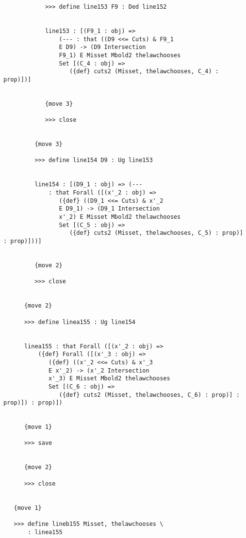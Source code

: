 \documentclass[12pt]{article}
\begin{document}
\begin{verbatim}
            >>> define line153 F9 : Ded line152


            line153 : [(F9_1 : obj) => 
                (--- : that ((D9 <<= Cuts) & F9_1 
                E D9) -> (D9 Intersection 
                F9_1) E Misset Mbold2 thelawchooses 
                Set [(C_4 : obj) => 
                   ({def} cuts2 (Misset, thelawchooses, C_4) : prop)])]


            {move 3}

            >>> close


         {move 3}

         >>> define line154 D9 : Ug line153


         line154 : [(D9_1 : obj) => (--- 
             : that Forall ([(x'_2 : obj) => 
                ({def} ((D9_1 <<= Cuts) & x'_2 
                E D9_1) -> (D9_1 Intersection 
                x'_2) E Misset Mbold2 thelawchooses 
                Set [(C_5 : obj) => 
                   ({def} cuts2 (Misset, thelawchooses, C_5) : prop)] : prop)]))]


         {move 2}

         >>> close


      {move 2}

      >>> define linea155 : Ug line154


      linea155 : that Forall ([(x'_2 : obj) => 
          ({def} Forall ([(x'_3 : obj) => 
             ({def} ((x'_2 <<= Cuts) & x'_3 
             E x'_2) -> (x'_2 Intersection 
             x'_3) E Misset Mbold2 thelawchooses 
             Set [(C_6 : obj) => 
                ({def} cuts2 (Misset, thelawchooses, C_6) : prop)] : prop)]) : prop)])


      {move 1}

      >>> save


      {move 2}

      >>> close


   {move 1}

   >>> define lineb155 Misset, thelawchooses \
       : linea155



\end{verbatim}
\end{document}
